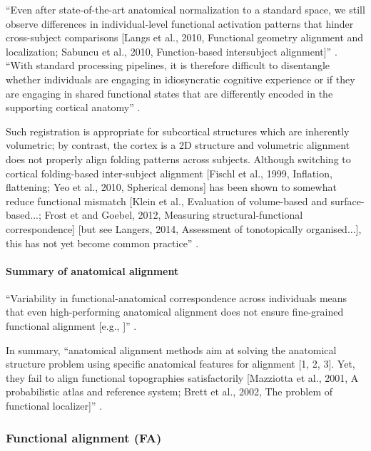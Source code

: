 %
``Even after state-of-the-art anatomical normalization to a standard space, we
still observe differences in individual-level functional activation patterns
that hinder cross-subject comparisons [Langs et al., 2010, Functional geometry
alignment and localization; Sabuncu et al., 2010, Function-based intersubject
alignment]'' \citep{bazeille2021empirical}.
%
``With standard processing pipelines, it is therefore difficult to disentangle
whether individuals are engaging in idiosyncratic cognitive experience or if
they are engaging in shared functional states that are differently encoded in
the supporting cortical anatomy'' \citep{bazeille2021empirical}.

%
Such registration is appropriate for subcortical structures which are inherently
volumetric; by contrast, the cortex is a 2D structure and volumetric alignment
does not properly align folding patterns across subjects. Although switching to
cortical folding-based inter-subject alignment [Fischl et al., 1999, Inflation,
flattening; Yeo et al., 2010, Spherical demons] has been shown to somewhat
reduce functional mismatch [Klein et al., Evaluation of volume-based and
surface-based...; Frost et and Goebel, 2012, Measuring structural-functional
correspondence] [but see Langers, 2014, Assessment of tonotopically
organised...], this has not yet become common practice''
\citep{dubois2016building}.


\paragraph{Summary of anatomical alignment}

%
``Variability in functional-anatomical correspondence across individuals means
that even high-performing anatomical alignment does not ensure fine-grained
functional alignment [e.g., \citet{frost2012measuring}]''
\citep{kumar2020brainiak}.

In summary, ``anatomical alignment methods aim at solving the anatomical
structure problem using specific anatomical features for alignment [1, 2, 3].
Yet, they fail to align functional topographies satisfactorily [Mazziotta et
al., 2001, A probabilistic atlas and reference system; Brett et al., 2002, The
problem of functional localizer]'' \citep{turek2017semi}.


\subsubsection{Functional alignment (FA)}

